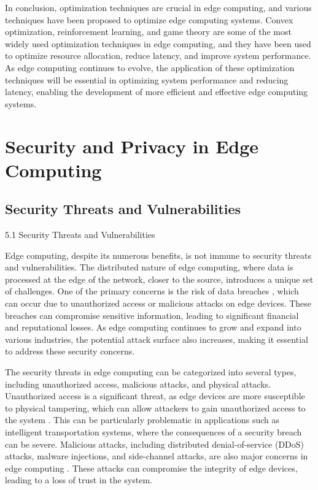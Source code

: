 \documentclass[11pt]{article}
\begin{document}
In conclusion, optimization techniques are crucial in edge computing, and various techniques have been proposed to optimize edge computing systems. Convex optimization, reinforcement learning, and game theory are some of the most widely used optimization techniques in edge computing, and they have been used to optimize resource allocation, reduce latency, and improve system performance. As edge computing continues to evolve, the application of these optimization techniques will be essential in optimizing system performance and reducing latency, enabling the development of more efficient and effective edge computing systems.

\section{Security and Privacy in Edge Computing}

\subsection{Security Threats and Vulnerabilities}

5.1 Security Threats and Vulnerabilities

Edge computing, despite its numerous benefits, is not immune to security threats and vulnerabilities. The distributed nature of edge computing, where data is processed at the edge of the network, closer to the source, introduces a unique set of challenges. One of the primary concerns is the risk of data breaches \cite{ref16}, which can occur due to unauthorized access or malicious attacks on edge devices. These breaches can compromise sensitive information, leading to significant financial and reputational losses. As edge computing continues to grow and expand into various industries, the potential attack surface also increases, making it essential to address these security concerns.

The security threats in edge computing can be categorized into several types, including unauthorized access, malicious attacks, and physical attacks. Unauthorized access is a significant threat, as edge devices are more susceptible to physical tampering, which can allow attackers to gain unauthorized access to the system \cite{ref89}. This can be particularly problematic in applications such as intelligent transportation systems, where the consequences of a security breach can be severe. Malicious attacks, including distributed denial-of-service (DDoS) attacks, malware injections, and side-channel attacks, are also major concerns in edge computing \cite{ref90}. These attacks can compromise the integrity of edge devices, leading to a loss of trust in the system.
\end{document}
